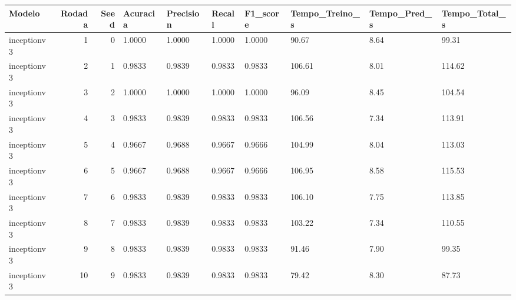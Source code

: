 \begin{tabular}{lrrlllllll}
\toprule
Modelo & Rodada & Seed & Acuracia & Precision & Recall & F1_score & Tempo_Treino_s & Tempo_Pred_s & Tempo_Total_s \\
\midrule
inceptionv3 & 1 & 0 & 1.0000 & 1.0000 & 1.0000 & 1.0000 & 90.67 & 8.64 & 99.31 \\
inceptionv3 & 2 & 1 & 0.9833 & 0.9839 & 0.9833 & 0.9833 & 106.61 & 8.01 & 114.62 \\
inceptionv3 & 3 & 2 & 1.0000 & 1.0000 & 1.0000 & 1.0000 & 96.09 & 8.45 & 104.54 \\
inceptionv3 & 4 & 3 & 0.9833 & 0.9839 & 0.9833 & 0.9833 & 106.56 & 7.34 & 113.91 \\
inceptionv3 & 5 & 4 & 0.9667 & 0.9688 & 0.9667 & 0.9666 & 104.99 & 8.04 & 113.03 \\
inceptionv3 & 6 & 5 & 0.9667 & 0.9688 & 0.9667 & 0.9666 & 106.95 & 8.58 & 115.53 \\
inceptionv3 & 7 & 6 & 0.9833 & 0.9839 & 0.9833 & 0.9833 & 106.10 & 7.75 & 113.85 \\
inceptionv3 & 8 & 7 & 0.9833 & 0.9839 & 0.9833 & 0.9833 & 103.22 & 7.34 & 110.55 \\
inceptionv3 & 9 & 8 & 0.9833 & 0.9839 & 0.9833 & 0.9833 & 91.46 & 7.90 & 99.35 \\
inceptionv3 & 10 & 9 & 0.9833 & 0.9839 & 0.9833 & 0.9833 & 79.42 & 8.30 & 87.73 \\
\bottomrule
\end{tabular}

